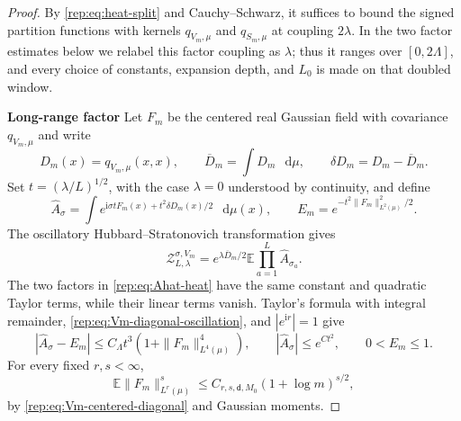 \documentclass[11pt,reqno]{amsart}
\numberwithin{equation}{section}
\theoremstyle{plain}
\theoremstyle{definition}
\renewcommand{\d}{\mathsf d}
\newcommand{\dd}{\mathop{}\!\mathrm d}
\newcommand{\E}{\mathbb E}
\newcommand{\step}[1]{\par\medskip\noindent\textbf{#1}}
\begin{document}
\begin{proof}
By \eqref{rep:eq:heat-split} and Cauchy--Schwarz, it suffices to bound the signed partition functions with kernels $q_{V_m,\mu}$ and $q_{S_m,\mu}$ at coupling $2\lambda$.  In the two factor estimates below we relabel this factor coupling as $\lambda$; thus it ranges over $[0,2\Lambda]$, and every choice of constants, expansion depth, and $L_0$ is made on that doubled window.

\step{Long-range factor} Let $F_m$ be the centered real Gaussian field with covariance $q_{V_m,\mu}$ and write
\begin{equation}\label{rep:eq:Dm-def}
 D_m(x)=q_{V_m,\mu}(x,x),\qquad
 \overline D_m=\int D_m\,\dd\mu,\qquad
 \delta D_m=D_m-\overline D_m.
\end{equation}
Set $t=(\lambda/L)^{1/2}$, with the case $\lambda=0$ understood by continuity, and define
\begin{equation}\label{rep:eq:Ahat-heat}
 \widehat A_\sigma
 =\int e^{\mathrm{i}\sigma tF_m(x)+t^2\delta D_m(x)/2}\,\dd\mu(x),
 \qquad
 E_m=e^{-t^2\|F_m\|_{L^2(\mu)}^2/2}.
\end{equation}
The oscillatory Hubbard--Stratonovich transformation gives
\begin{equation}\label{rep:eq:long-field-heat}
 \mathcal Z_{L,\lambda}^{\sigma,V_m}
 =e^{\lambda\overline D_m/2}\E\prod_{a=1}^L\widehat A_{\sigma_a}.
\end{equation}
The two factors in \eqref{rep:eq:Ahat-heat} have the same constant and quadratic Taylor terms, while their linear terms vanish.  Taylor's formula with integral remainder, \eqref{rep:eq:Vm-diagonal-oscillation}, and $|e^{\mathrm{i} r}|=1$ give
\begin{equation}\label{rep:eq:Ahat-error-heat}
 |\widehat A_\sigma-E_m|
 \le C_\Lambda t^3\left(1+\|F_m\|_{L^4(\mu)}^4\right),
 \qquad
 |\widehat A_\sigma|\le e^{Ct^2},
 \qquad 0<E_m\le1.
\end{equation}
For every fixed $r,s<\infty$,
\begin{equation}\label{rep:eq:Fm-moments-heat}
 \E\|F_m\|_{L^r(\mu)}^s
 \le C_{r,s,\d,M_0}(1+\log m)^{s/2},
\end{equation}
by \eqref{rep:eq:Vm-centered-diagonal} and Gaussian moments.


\end{proof}
\end{document}
